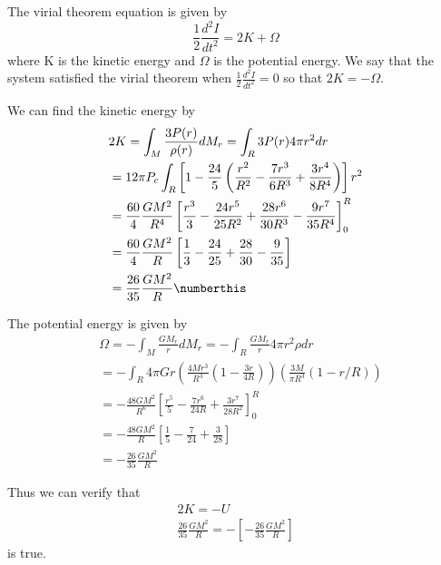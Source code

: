 The virial theorem equation is given by 
\begin{equation}
    \frac{1}{2}\frac{d^2I}{dt^2} = 2K + \Omega
\end{equation}
where K is the kinetic energy and $\Omega$ is the potential energy. We say that the system satisfied the virial theorem when $\frac{1}{2}\frac{d^2I}{dt^2} = 0 $ so that $ 2K = -\Omega$.

We can find the kinetic energy by  
\begin{align*}
    &2K = \int_M\frac{3P(r)}{\rho(r)}dM_r = \int_R 3P(r)4\pi r^2 dr\\
    &= 12\pi P_c\int_R\left[1-\frac{24}{5}\left(\frac{r^2}{R^2}-\frac{7r^3}{6R^3}+\frac{3r^4}{8R^4}\right)\right]r^2\\
    &= \frac{60}{4}\frac{GM^2}{R^4} \left[\frac{r^3}{3}-\frac{24r^5}{25R^2}+\frac{28r^6}{30R^3}-\frac{9r^7}{35R^4}\right]_0^R\\
    &= \frac{60}{4}\frac{GM^2}{R}\left[\frac{1}{3}-\frac{24}{25}+\frac{28}{30}-\frac{9}{35}\right]\\
    &= \frac{26}{35}\frac{GM^2}{R}\numberthis\label{eq:kineticEnergy}
\end{align*}

The potential energy is given by
\begin{align*}
    &\Omega = -\int_M \frac{GM_r}{r}dM_r = -\int_R \frac{GM_r}{r}4\pi r^2 \rho dr\\
    &= -\int_R 4\pi G r \left(\frac{4Mr^3}{R^3}\left(1-\frac{3r}{4R}\right)\right)\left(\frac{3M}{\pi R^3}(1 - r/R)\right)\\
    &= -\frac{48GM^2}{R^6}\left[\frac{r^5}{5}-\frac{7r^6}{24R}+\frac{3r^7}{28R^2}\right]^R_0\\
    &= -\frac{48GM^2}{R}\left[\frac{1}{5}-\frac{7}{24}+\frac{3}{28}\right]\\
    &= -\frac{26}{35}\frac{GM^2}{R}
\end{align*}

Thus we can verify that
\begin{align*}
    2K = - U\\
    \frac{26}{35}\frac{GM^2}{R} = -\left[-\frac{26}{35}\frac{GM^2}{R}\right]
\end{align*}
is true.

\clearpage
